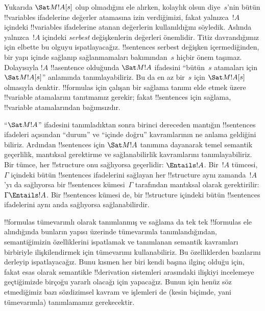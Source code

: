 



Yukarıda $\Sat M{!A}[s]$ olup olmadığını ele alırken, kolaylık olsun
diye~$s$'nin bütün !!{variable}s ifadelerine değerler atamasına izin
verdiğimizi, fakat yalnızca~$!A$ içindeki !!{variable}s ifadelerine
atanan değerlerin kullanıldığını söyledik. Aslında yalnızca~$!A$
içindeki \emph{serbest} değişkenlerin değerleri önemlidir. Titiz
davrandığımız için elbette bu olguyu ispatlayacağız. !!{sentence}s
serbest değişken içermediğinden, bir yapı içinde sağlanıp
sağlanmamaları bakımından~$s$ hiçbir önem taşımaz. Dolayısıyla $!A$
!!a{sentence} olduğunda $\Sat M{!A}$ ifadesini ``bütün~$s$ atamaları
için $\Sat M{!A}[s]$'' anlamında tanımlayabiliriz. Bu da en az bir~$s$
için $\Sat M{!A}[s]$ olmasıyla denktir. !!{formula}s için çalışan bir
sağlama tanımı elde etmek üzere !!{variable} atamalarını tanıtmamız
gerekir; fakat !!{sentence}s için sağlama, !!{variable} atamalarından
bağımsızdır.

``$\Sat M{!A}$'' ifadesini tanımladıktan sonra birinci dereceden
mantığın !!{sentence}s ifadeleri açısından ``durum'' ve ``içinde
doğru'' kavramlarının ne anlama geldiğini biliriz. Ardından
!!{sentence}s için $\Sat M{!A}$ tanımına dayanarak temel semantik
geçerlilik, mantıksal gerektirme ve sağlanabilirlik kavramlarını
tanımlayabiliriz. Bir tümce, her !!{structure} onu sağlıyorsa geçerlidir:
$\Entails !A$. Bir~$!A$ tümcesi,~$\Gamma$ içindeki bütün !!{sentence}s
ifadelerini sağlayan her !!{structure} aynı zamanda~$!A$'yı da
sağlıyorsa bir !!{sentence}s kümesi~$\Gamma$ tarafından mantıksal
olarak gerektirilir: $\Gamma\Entails !A$. Bir !!{sentence}s kümesi de,
bir !!{structure} içindeki bütün !!{sentence}s ifadelerini aynı anda
sağlıyorsa sağlanabilirdir.

!!{formula}s tümevarımlı olarak tanımlanmış ve sağlama da tek tek
!!{formula}s ele alındığında bunların yapısı üzerinde tümevarımla
tanımlandığından, semantiğimizin
özelliklerini ispatlamak ve tanımlanan semantik kavramları birbiriyle
ilişkilendirmek için tümevarımı kullanabiliriz. Bu özelliklerden
bazılarını derleyip ispatlayacağız. Bunu kısmen her biri kendi başına
ilginç olduğu için, fakat esas olarak semantikle !!{derivation}
sistemleri arasındaki ilişkiyi incelemeye geçtiğimizde birçoğu yararlı
olacağı için yapacağız. Bunun için henüz söz etmediğimiz bazı sözdizimsel
kavram ve işlemleri de (kesin biçimde, yani tümevarımla) tanımlamamız
gerekecektir.

